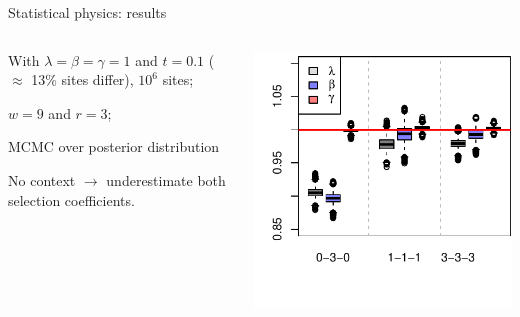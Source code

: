 \documentclass[smaller]{beamer}
\begin{document}
\begin{frame}{Statistical physics: results}
  \begin{columns}[c]
    \begin{column}{.4\textwidth}

      With $\lambda = \beta = \gamma = 1$ and $t = 0.1$  ($\approx$ 13\% sites differ), $10^6$ sites; \\

      \vspace{1em}

      $w=9$ and $r=3$;

      \vspace{1em}

      MCMC over posterior distribution

      \vspace{2em}

      No context $\longrightarrow$ underestimate both selection coefficients.

    \end{column}
    \begin{column}{.6\textwidth}

  \includegraphics[width=\textwidth]{../../../writeup-plots/selsims-2013-05-28-17-12-0275615-estimate-boxplots}

    \end{column}
  \end{columns}

\end{frame}
\end{document}
